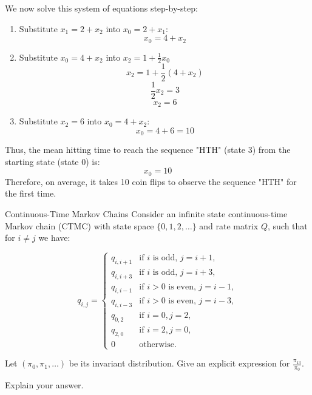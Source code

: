 \begin{solution}
  We now solve this system of equations step-by-step:

  \begin{enumerate}
    \item Substitute \( x_1 = 2 + x_2 \) into \( x_0 = 2 + x_1 \):
      \[
        x_0 = 4 + x_2
      \]
    \item Substitute \( x_0 = 4 + x_2 \) into \( x_2 = 1 + \frac{1}{2}x_0 \)
      \[
        x_2 = 1 + \frac{1}{2}\left( 4 + x_2 \right)
      \]
      \[
        \frac{1}{2}x_2 = 3
      \]
      \[
        x_2 = 6
      \]
    \item Substitute \( x_2 = 6 \) into \( x_0 = 4 + x_2 \):
      \[
        x_0 = 4 + 6 = 10
      \]
  \end{enumerate}

  Thus, the mean hitting time to reach the sequence "HTH" (state 3) from the starting state (state 0) is:
  \[
  \boxed{x_0 = 10}
  \]
  Therefore, on average, it takes 10 coin flips to observe the sequence "HTH" for the first time.
\end{solution}

\begin{problem}{Continuous-Time Markov Chains}
Consider an infinite state continuous-time Markov chain (CTMC) with state space $\{0, 1, 2, \ldots\}$ and rate matrix $Q$, such that for $i \neq j$ we have:

\[
q_{i,j} =
\begin{cases}
    q_{i,i+1} & \text{if } i \text{ is odd, } j = i + 1, \\
    q_{i,i+3} & \text{if } i \text{ is odd, } j = i + 3, \\
    q_{i,i-1} & \text{if } i > 0 \text{ is even, } j = i - 1, \\
    q_{i,i-3} & \text{if } i > 0 \text{ is even, } j = i - 3, \\
    q_{0,2} & \text{if } i = 0, j = 2, \\
    q_{2,0} & \text{if } i = 2, j = 0, \\
    0 & \text{otherwise.}
\end{cases}
\]

Let $(\pi_0, \pi_1, \ldots)$ be its invariant distribution. Give an explicit expression for $\frac{\pi_{13}}{\pi_0}$.

Explain your answer.
\end{problem}


